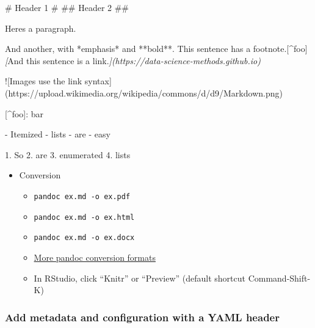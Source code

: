 \documentclass[
]{article}
\newenvironment{Shaded}{\begin{snugshade}}{\end{snugshade}}
\newcommand{\AlertTok}[1]{\textcolor[rgb]{0.94,0.16,0.16}{#1}}
\newcommand{\CommentTok}[1]{\textcolor[rgb]{0.56,0.35,0.01}{\textit{#1}}}
\newcommand{\FunctionTok}[1]{\textcolor[rgb]{0.00,0.00,0.00}{#1}}
\newcommand{\NormalTok}[1]{#1}
\newcommand{\OtherTok}[1]{\textcolor[rgb]{0.56,0.35,0.01}{#1}}
\newcommand{\SpecialStringTok}[1]{\textcolor[rgb]{0.31,0.60,0.02}{#1}}
\providecommand{\tightlist}{%
  \setlength{\itemsep}{0pt}\setlength{\parskip}{0pt}}
\begin{document}
\begin{Shaded}
\begin{Highlighting}[]
\FunctionTok{\# Header 1 \#}
\FunctionTok{\#\# Header 2 \#\#}

\NormalTok{Here\textquotesingle{}s a paragraph. }

\NormalTok{And another, with *emphasis* and **bold**.  This sentence has a footnote.}\OtherTok{[\^{}foo]}  \CommentTok{[}\OtherTok{And this sentence is a link.}\CommentTok{](https://data{-}science{-}methods.github.io)}

\AlertTok{![Images use the link syntax](https://upload.wikimedia.org/wikipedia/commons/d/d9/Markdown.png)}

\OtherTok{[\^{}foo]: }\NormalTok{bar}

\SpecialStringTok{{-} }\NormalTok{Itemized}
\SpecialStringTok{{-} }\NormalTok{lists}
\SpecialStringTok{{-} }\NormalTok{are}
\SpecialStringTok{{-} }\NormalTok{easy}

\SpecialStringTok{1. }\NormalTok{So}
\SpecialStringTok{2. }\NormalTok{are}
\SpecialStringTok{3. }\NormalTok{enumerated}
\SpecialStringTok{4. }\NormalTok{lists}
\end{Highlighting}
\end{Shaded}

\begin{itemize}
\tightlist
\item
  Conversion

  \begin{itemize}
  \tightlist
  \item
    \texttt{pandoc\ ex.md\ -o\ ex.pdf}
  \item
    \texttt{pandoc\ ex.md\ -o\ ex.html}
  \item
    \texttt{pandoc\ ex.md\ -o\ ex.docx}
  \item
    \href{https://pandoc.org/index.html}{More pandoc conversion formats}
  \item
    In RStudio, click ``Knitr'' or ``Preview'' (default shortcut Command-Shift-K)
  \end{itemize}
\end{itemize}

\hypertarget{add-metadata-and-configuration-with-a-yaml-header}{%
\subsubsection{Add metadata and configuration with a YAML header}\label{add-metadata-and-configuration-with-a-yaml-header}}
\end{document}
